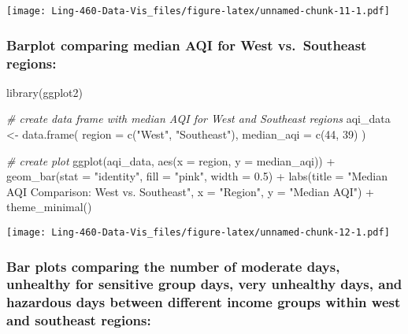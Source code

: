 \documentclass[
]{article}
\newenvironment{Shaded}{\begin{snugshade}}{\end{snugshade}}
\newcommand{\AttributeTok}[1]{\textcolor[rgb]{0.77,0.63,0.00}{#1}}
\newcommand{\CommentTok}[1]{\textcolor[rgb]{0.56,0.35,0.01}{\textit{#1}}}
\newcommand{\DecValTok}[1]{\textcolor[rgb]{0.00,0.00,0.81}{#1}}
\newcommand{\FloatTok}[1]{\textcolor[rgb]{0.00,0.00,0.81}{#1}}
\newcommand{\FunctionTok}[1]{\textcolor[rgb]{0.00,0.00,0.00}{#1}}
\newcommand{\NormalTok}[1]{#1}
\newcommand{\OtherTok}[1]{\textcolor[rgb]{0.56,0.35,0.01}{#1}}
\newcommand{\SpecialCharTok}[1]{\textcolor[rgb]{0.00,0.00,0.00}{#1}}
\newcommand{\StringTok}[1]{\textcolor[rgb]{0.31,0.60,0.02}{#1}}
\begin{document}
\texttt{[image: Ling-460-Data-Vis\_files/figure-latex/unnamed-chunk-11-1.pdf]}

\hypertarget{barplot-comparing-median-aqi-for-west-vs.-southeast-regions}{%
\subsubsection{Barplot comparing median AQI for West vs.~Southeast
regions:}\label{barplot-comparing-median-aqi-for-west-vs.-southeast-regions}}

\begin{Shaded}
\begin{Highlighting}[]
\FunctionTok{library}\NormalTok{(ggplot2)}

\CommentTok{\# create data frame with median AQI for West and Southeast regions}
\NormalTok{aqi\_data }\OtherTok{\textless{}{-}} \FunctionTok{data.frame}\NormalTok{(}
  \AttributeTok{region =} \FunctionTok{c}\NormalTok{(}\StringTok{"West"}\NormalTok{, }\StringTok{"Southeast"}\NormalTok{),}
  \AttributeTok{median\_aqi =} \FunctionTok{c}\NormalTok{(}\DecValTok{44}\NormalTok{, }\DecValTok{39}\NormalTok{)}
\NormalTok{)}

\CommentTok{\# create plot}
\FunctionTok{ggplot}\NormalTok{(aqi\_data, }\FunctionTok{aes}\NormalTok{(}\AttributeTok{x =}\NormalTok{ region, }\AttributeTok{y =}\NormalTok{ median\_aqi)) }\SpecialCharTok{+}
  \FunctionTok{geom\_bar}\NormalTok{(}\AttributeTok{stat =} \StringTok{"identity"}\NormalTok{, }\AttributeTok{fill =} \StringTok{"pink"}\NormalTok{, }\AttributeTok{width =} \FloatTok{0.5}\NormalTok{) }\SpecialCharTok{+}
  \FunctionTok{labs}\NormalTok{(}\AttributeTok{title =} \StringTok{"Median AQI Comparison: West vs. Southeast"}\NormalTok{,}
       \AttributeTok{x =} \StringTok{"Region"}\NormalTok{, }\AttributeTok{y =} \StringTok{"Median AQI"}\NormalTok{) }\SpecialCharTok{+}
   \FunctionTok{theme\_minimal}\NormalTok{()}
\end{Highlighting}
\end{Shaded}

\texttt{[image: Ling-460-Data-Vis\_files/figure-latex/unnamed-chunk-12-1.pdf]}

\hypertarget{bar-plots-comparing-the-number-of-moderate-days-unhealthy-for-sensitive-group-days-very-unhealthy-days-and-hazardous-days-between-different-income-groups-within-west-and-southeast-regions}{%
\subsubsection{Bar plots comparing the number of moderate days,
unhealthy for sensitive group days, very unhealthy days, and hazardous
days between different income groups within west and southeast
regions:}\label{bar-plots-comparing-the-number-of-moderate-days-unhealthy-for-sensitive-group-days-very-unhealthy-days-and-hazardous-days-between-different-income-groups-within-west-and-southeast-regions}}
\end{document}
